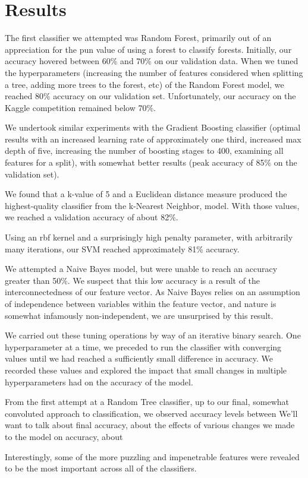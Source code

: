 \section{Results}
\label{sec:-res}
The first classifier we attempted was Random Forest, primarily out of an 
appreciation for the pun value of using a forest to classify forests. 
Initially, our accuracy hovered between 60\% and 70\% on our validation 
data.  When we tuned the hyperparameters (increasing the number of 
features considered when splitting a tree, adding more trees to the 
forest, etc) of the Random Forest model, we reached 80\% accuracy on 
our validation set.  Unfortunately, our accuracy on the Kaggle 
competition remained below 70\%.  

We undertook similar experiments with the Gradient Boosting classifier 
(optimal results with an increased learning rate of approximately one 
third, increased max depth of five, increasing the number of boosting 
stages to 400, examining all features for a split), with somewhat 
better results (peak accuracy of 85\% on the validation set).  

We found that a k-value of 5 and a Euclidean distance measure
produced the highest-quality classifier from the k-Nearest Neighbor, 
model.  With those values, we reached a validation accuracy of about 
82\%.

Using an rbf kernel and a surprisingly high penalty parameter, with 
arbitrarily many iterations, our SVM reached approximately 81\% 
accuracy.

We attempted a Naive Bayes model, but were unable to reach an accuracy 
greater than 50\%.  We suspect that this low accuracy is a result of 
the interconnectedness of our feature vector.  As Naive Bayes relies on 
an assumption of independence between variables within the feature 
vector, and nature is somewhat infamously non-independent\cite{silent}, 
we are unsurprised by this result.

We carried out these tuning operations by way of an iterative binary 
search.  One hyperparameter at a time, we preceded to run the 
classifier with converging values until we had reached a sufficiently 
small difference in accuracy.  We recorded these values and explored 
the impact that small changes in multiple hyperparameters had on the 
accuracy of the model.  




From the first attempt at a Random Tree classifier, up to our final, 
somewhat convoluted approach to classification, we observed accuracy 
levels between
We'll want to talk about final accuracy, about the effects of various changes 
we made to the model on accuracy, about  

Interestingly, some of the more puzzling and impenetrable features 
were revealed to be the most important across all of the classifiers.

